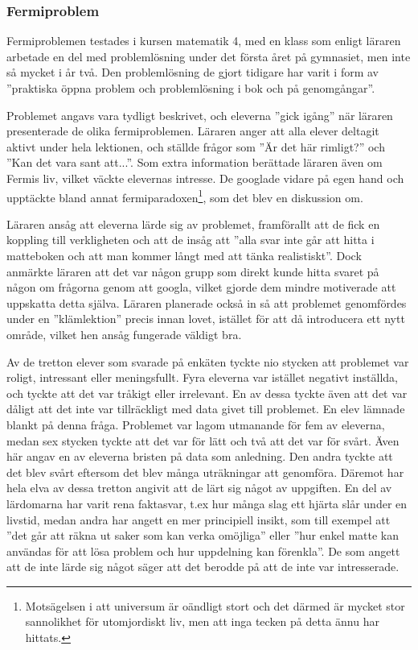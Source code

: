     
    \subsubsection{Fermiproblem}
        \label{resutat:Fermi}
        \textcolor{lila}{Fermiproblemen testades i kursen matematik 4, med en klass som enligt läraren arbetade en del med problemlösning under det första året på gymnasiet, men inte så mycket i år två. Den problemlösning de gjort tidigare har varit i form av ''praktiska öppna problem och problemlösning i bok och på genomgångar''.}
        
        \textcolor{lila}{Problemet angavs vara tydligt beskrivet, och eleverna ''gick igång'' när läraren presenterade de olika fermiproblemen. Läraren anger att alla elever deltagit aktivt under hela lektionen, och ställde frågor som ''Är det här rimligt?'' och ''Kan det vara sant att...''. Som extra information berättade läraren även om Fermis liv, vilket väckte elevernas intresse. De googlade vidare på egen hand och upptäckte bland annat fermiparadoxen\footnote{Motsägelsen i att universum är oändligt stort och det därmed är mycket stor sannolikhet för utomjordiskt liv, men att inga tecken på detta ännu har hittats.}, som det blev en diskussion om.}
        
        \textcolor{lila}{Läraren ansåg att eleverna lärde sig av problemet, framförallt att de fick en koppling till verkligheten och att de insåg att ''alla svar inte går att hitta i matteboken och att man kommer långt med att tänka realistiskt''. Dock anmärkte läraren att det var någon grupp som direkt kunde hitta svaret på någon om frågorna genom att googla, vilket gjorde dem mindre motiverade att uppskatta detta själva. Läraren planerade också in så att problemet genomfördes under en ''klämlektion'' precis innan lovet, istället för att då introducera ett nytt område, vilket hen ansåg fungerade väldigt bra.}
        
        \textcolor{lila}{Av de tretton elever som svarade på enkäten tyckte nio stycken att problemet var roligt, intressant eller meningsfullt. Fyra eleverna var istället negativt inställda, och tyckte att det var tråkigt eller irrelevant. En av dessa tyckte även att det var dåligt att det inte var tillräckligt med data givet till problemet. En elev lämnade blankt på denna fråga. Problemet var lagom utmanande för fem av eleverna, medan sex stycken tyckte att det var för lätt och två att det var för svårt. Även här angav en av eleverna bristen på data som anledning. Den andra tyckte att det blev svårt eftersom det blev många uträkningar att genomföra. Däremot har hela elva av dessa tretton angivit att de lärt sig något av uppgiften. En del av lärdomarna har varit rena faktasvar, t.ex hur många slag ett hjärta slår under en livstid, medan andra har angett en mer principiell insikt, som till exempel att ''det går att räkna ut saker som kan verka omöjliga'' eller ''hur enkel matte kan användas för att lösa problem och hur uppdelning kan förenkla''. De som angett att de inte lärde sig något säger att det berodde på att de inte var intresserade.}
        
